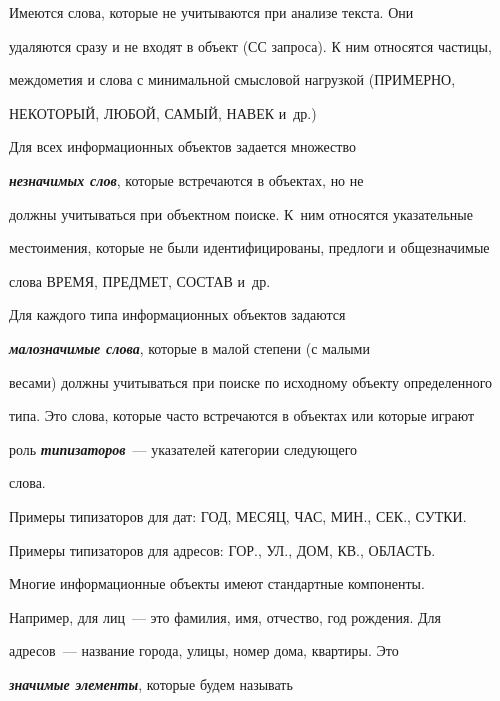     Имеются слова, которые не учитываются при анализе текста. Они 


удаляются сразу и не входят в объект (СС запроса). К ним относятся частицы, 


междометия и слова с минимальной смысловой нагрузкой (ПРИМЕРНО, 


НЕКОТОРЫЙ, ЛЮБОЙ, САМЫЙ, НАВЕК и~др.) 


    


    Для всех информационных объектов задается множество 


{\bfseries\textit{незначимых слов}}, которые встречаются в объектах, но не 


должны учитываться при объектном поиске. К~ним относятся указательные 


местоимения, которые не были идентифицированы, предлоги и общезначимые 


слова ВРЕМЯ, ПРЕДМЕТ, СОСТАВ и~др.


    


    Для каждого типа информационных объектов задаются 


{\bfseries\textit{малозначимые слова}}, которые в малой степени (с малыми 


весами) должны учитываться при поиске по исходному объекту определенного 


типа. Это слова, которые часто встречаются в объектах или которые играют 


роль {\bfseries\textit{типизаторов}}~--- указателей категории следующего 


слова.


    


    Примеры типизаторов для дат: ГОД, МЕСЯЦ, ЧАС, МИН., СЕК., \mbox{СУТКИ}.


    


    Примеры типизаторов для адресов: ГОР., УЛ., ДОМ, КВ., ОБЛАСТЬ.


    


    Многие информационные объекты имеют стандартные компоненты. 


Например, для лиц~--- это фамилия, имя, отчество, год рождения. Для 


адресов~--- название города, улицы, номер дома, квартиры. Это 


{\bfseries\textit{значимые элементы}}, которые будем называть 


